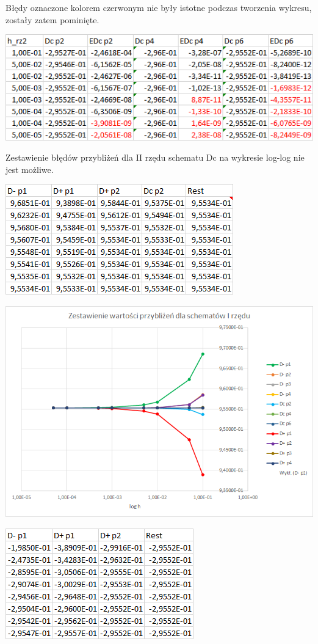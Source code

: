 Błędy oznaczone kolorem czerwonym nie były istotne podczas tworzenia wykresu, zostały zatem pominięte.

\includegraphics{Lab2/charts/rz2_log_Dc_dane.png}

Zestawienie błędów przybliżeń dla II rzędu schematu Dc na wykresie log-log nie jest możliwe. 

\includegraphics{Lab2/charts/rz1_log_e_dane.png}

\includegraphics{Lab2/charts/rz1_log_e.png}
\newpage


\includegraphics{Lab2/charts/rz2_log_e_dane.png}

